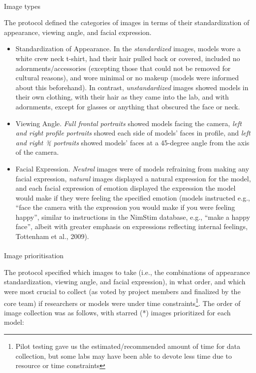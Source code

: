 \documentclass[
  letterpaper,
  DIV=11,
  numbers=noendperiod]{scrartcl}
\makeatletter
\let\oldparagraph\paragraph
\renewcommand{\paragraph}{
    \@ifstar
      \xxxParagraphStar
      \xxxParagraphNoStar
  }
\newcommand{\xxxParagraphStar}[1]{\oldparagraph*{#1}\mbox{}}
\newcommand{\xxxParagraphNoStar}[1]{\oldparagraph{#1}\mbox{}}
\providecommand{\tightlist}{%
  \setlength{\itemsep}{0pt}\setlength{\parskip}{0pt}}
\makeatother
\begin{document}
\paragraph{Image types}\label{image-types}

The protocol defined the categories of images in terms of their
standardization of appearance, viewing angle, and facial expression.

\begin{itemize}
\tightlist
\item
  Standardization of Appearance. In the \emph{standardized} images,
  models wore a white crew neck t-shirt, had their hair pulled back or
  covered, included no adornments/accessories (excepting those that
  could not be removed for cultural reasons), and wore minimal or no
  makeup (models were informed about this beforehand). In contrast,
  \emph{unstandardized} images showed models in their own clothing, with
  their hair as they came into the lab, and with adornments, except for
  glasses or anything that obscured the face or neck.\\
\item
  Viewing Angle. \emph{Full frontal portraits} showed models facing the
  camera, \emph{left and right profile portraits} showed each side of
  models' faces in profile, and \emph{left and right ¾ portraits} showed
  models' faces at a 45-degree angle from the axis of the camera.\\
\item
  Facial Expression. \emph{Neutral} images were of models refraining
  from making any facial expression, \emph{natural} images displayed a
  natural expression for the model, and each facial expression of
  emotion displayed the expression the model would make if they were
  feeling the specified emotion (models instructed e.g., ``face the
  camera with the expression you would make if you were feeling happy'',
  similar to instructions in the NimStim database, e.g., ``make a happy
  face'', albeit with greater emphasis on expressions reflecting
  internal feelings, Tottenham et al., 2009).
\end{itemize}

\paragraph{Image prioritisation}\label{image-prioritisation}

The protocol specified which images to take (i.e., the combinations of
appearance standardization, viewing angle, and facial expression), in
what order, and which were most crucial to collect (as voted by project
members and finalized by the core team) if researchers or models were
under time constraints\footnote{Pilot testing gave us the
  estimated/recommended amount of time for data collection, but some
  labs may have been able to devote less time due to resource or time
  constraints}. The order of image collection was as follows, with
starred (*) images prioritized for each model:
\end{document}
